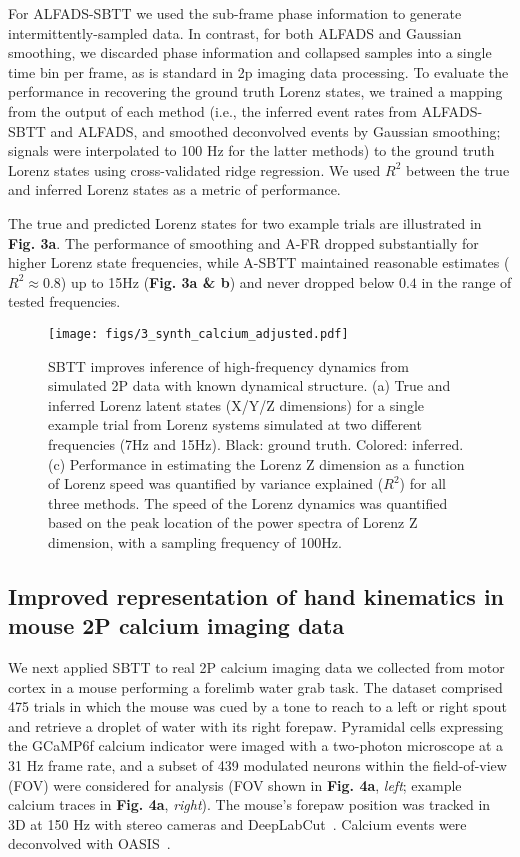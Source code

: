 \documentclass{article}
\begin{document}
For ALFADS-SBTT we used the sub-frame phase information to generate intermittently-sampled data. In contrast, for both ALFADS and Gaussian smoothing, we discarded phase information and collapsed samples into a single time bin per frame, as is standard in 2p imaging data processing. To evaluate the performance in recovering the ground truth Lorenz states, we trained a mapping from the output of each method (i.e., the inferred event rates from ALFADS-SBTT and ALFADS, and smoothed deconvolved events by Gaussian smoothing; signals were interpolated to 100 Hz for the latter methods) to the ground truth Lorenz states using cross-validated ridge regression. We used $R^2$ between the true and inferred Lorenz states as a metric of performance. 

The true and predicted Lorenz states for two example trials are illustrated in \textbf{Fig. 3a}. The performance of smoothing and A-FR dropped substantially for higher Lorenz state frequencies, while A-SBTT maintained reasonable estimates ($R^2 \approx 0.8$) up to 15Hz (\textbf{Fig. 3a \& b}) and never dropped below $0.4$ in the range of tested frequencies.

\begin{figure}
  \centering
  \texttt{[image: figs/3\_synth\_calcium\_adjusted.pdf]}
  \caption{SBTT improves inference of high-frequency dynamics from simulated 2P data with known dynamical structure. (a) True and inferred Lorenz latent states (X/Y/Z dimensions) for a single example trial from Lorenz systems simulated at two different frequencies (7Hz and 15Hz). Black: ground truth. Colored: inferred. (c) Performance in estimating the Lorenz Z dimension as a function of  Lorenz speed was quantified by variance explained ($R^2$) for all three methods. The speed of the Lorenz dynamics was quantified based on the peak location of the power spectra of Lorenz Z dimension, with a sampling frequency of 100Hz.
}
  \label{fig:synth_calcium}
\end{figure}

\subsection{Improved representation of hand kinematics in mouse 2P calcium imaging data}

We next applied SBTT to real 2P calcium imaging data we collected from motor cortex in a mouse performing a forelimb water grab task. The dataset comprised 475 trials in which the mouse was cued by a tone to reach to a left or right spout and retrieve a droplet of water with its right forepaw. Pyramidal cells expressing the GCaMP6f calcium indicator were imaged with a two-photon microscope at a 31 Hz frame rate, and a subset of 439 modulated neurons within the field-of-view (FOV) were considered for analysis (FOV shown in \textbf{Fig. 4a}, \textit{left}; example calcium traces in \textbf{Fig. 4a}, \textit{right}). The mouse’s forepaw position was tracked in 3D at 150 Hz with stereo cameras and DeepLabCut~\cite{mathis2018deeplabcut}. Calcium events were deconvolved with OASIS~\cite{friedrich2017fast,giovannucci_caiman_2019}.
\end{document}
